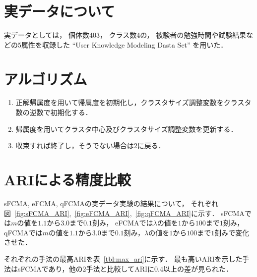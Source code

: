 \documentclass[a4j,12pt,dvipdfmx,oneside]{jsbook}
\theoremstyle{definition}
\begin{document}
 \section{実データについて}\label{sec:about_real_data}
 実データとしては，
 個体数403，
 クラス数4の，
 被験者の勉強時間や試験結果などの5属性を収録した
 ``User Knowledge Modeling Dasta Set''
 を用いた．
 
 \section{アルゴリズム}\label{sec:suggest_algorythm} 
  \begin{enumerate}
   \item 正解帰属度を用いて帰属度を初期化し，クラスタサイズ調整変数をクラスタ数の逆数で初期化する．
   \item 帰属度を用いてクラスタ中心及びクラスタサイズ調整変数を更新する．
   \item 収束すれば終了し，そうでない場合は$2$に戻る．
  \end{enumerate}
  
 \section{ARIによる精度比較}\label{sec:ari_compare}

  sFCMA, eFCMA, qFCMAの実データ実験の結果について，
  それぞれ図~\ref{fig:sFCMA_ARI},~\ref{fig:eFCMA_ARI},~\ref{fig:qFCMA_ARI}に示す．
  sFCMAでは$m$の値を$1.1$から$3.0$まで$0.1$刻み，
  eFCMAでは$\lambda$の値を$1$から$100$まで$1$刻み，
  qFCMAでは$m$の値を$1.1$から$3.0$まで$0.1$刻み，$\lambda$の値を$1$から$100$まで$1$刻みで変化させた．
  
  それぞれの手法の最高ARIを表~\ref{tbl:max_ari}に示す．
  最も高いARIを示した手法はsFCMAであり，他の$2$手法と比較してARIに$0.4$以上の差が見られた．
 
\end{document}
